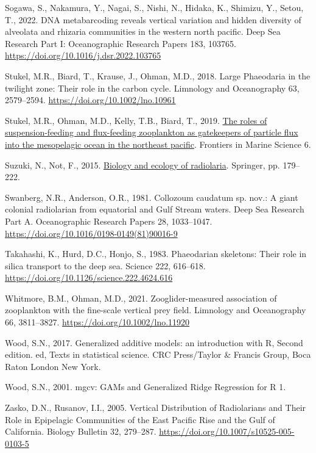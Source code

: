 \documentclass[
]{article}
\newlength{\cslhangindent}
\newlength{\cslentryspacingunit} %
\newenvironment{CSLReferences}[2] %
 {%
  \setlength{\parindent}{0pt}
  \ifodd #1
  \let\oldpar\par
  \def\par{\hangindent=\cslhangindent\oldpar}
  \fi
  \setlength{\parskip}{#2\cslentryspacingunit}
 }%
 {}
\begin{document}
\begin{CSLReferences}{1}{0}
\leavevmode{}%
Sogawa, S., Nakamura, Y., Nagai, S., Nishi, N., Hidaka, K., Shimizu, Y.,
Setou, T., 2022. DNA metabarcoding reveals vertical variation and hidden
diversity of alveolata and rhizaria communities in the western north
pacific. Deep Sea Research Part I: Oceanographic Research Papers 183,
103765. \url{https://doi.org/10.1016/j.dsr.2022.103765}

\leavevmode{}%
Stukel, M.R., Biard, T., Krause, J., Ohman, M.D., 2018. Large Phaeodaria
in the twilight zone: Their role in the carbon cycle. Limnology and
Oceanography 63, 2579--2594. \url{https://doi.org/10.1002/lno.10961}

\leavevmode{}%
Stukel, M.R., Ohman, M.D., Kelly, T.B., Biard, T., 2019.
\href{https://www.frontiersin.org/articles/10.3389/fmars.2019.00397}{The
roles of suspension-feeding and flux-feeding zooplankton as gatekeepers
of particle flux into the mesopelagic ocean in the northeast pacific}.
Frontiers in Marine Science 6.

\leavevmode{}%
Suzuki, N., Not, F., 2015.
\href{https://link.springer.com/chapter/10.1007/978-4-431-55130-0_8}{Biology
and ecology of radiolaria}. Springer, pp. 179--222.

\leavevmode{}%
Swanberg, N.R., Anderson, O.R., 1981. Collozoum caudatum sp. nov.: A
giant colonial radiolarian from equatorial and Gulf Stream waters. Deep
Sea Research Part A. Oceanographic Research Papers 28, 1033--1047.
\url{https://doi.org/10.1016/0198-0149(81)90016-9}

\leavevmode{}%
Takahashi, K., Hurd, D.C., Honjo, S., 1983. Phaeodarian skeletons: Their
role in silica transport to the deep sea. Science 222, 616--618.
\url{https://doi.org/10.1126/science.222.4624.616}

\leavevmode{}%
Whitmore, B.M., Ohman, M.D., 2021. Zooglider-measured association of
zooplankton with the fine-scale vertical prey field. Limnology and
Oceanography 66, 3811--3827. \url{https://doi.org/10.1002/lno.11920}

\leavevmode{}%
Wood, S.N., 2017. Generalized additive models: an introduction with R,
Second edition. ed, Texts in statistical science. CRC Press/Taylor \&
Francis Group, Boca Raton London New York.

\leavevmode{}%
Wood, S.N., 2001. mgcv: GAMs and Generalized Ridge Regression for R 1.

\leavevmode{}%
Zasko, D.N., Rusanov, I.I., 2005. Vertical Distribution of Radiolarians
and Their Role in Epipelagic Communities of the East Pacific Rise and
the Gulf of California. Biology Bulletin 32, 279--287.
\url{https://doi.org/10.1007/s10525-005-0103-5}

\end{CSLReferences}
\end{document}
